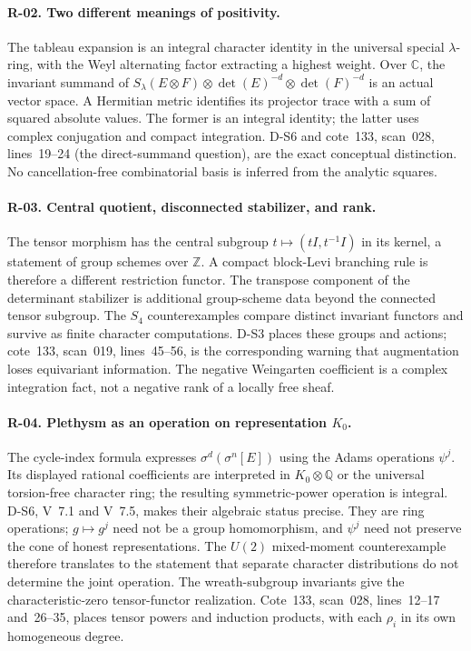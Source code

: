 \documentclass[11pt,a4paper]{article}
\theoremstyle{definition}\newtheorem{definition}{Definition}
\begin{document}
\paragraph{R-02. Two different meanings of positivity.}
The tableau expansion is an integral character identity in the universal special $\lambda$-ring, with the Weyl alternating factor extracting a highest weight. Over $\mathbb C$, the invariant summand of $S_\lambda(E\otimes F)\otimes\det(E)^{-d}\otimes\det(F)^{-d}$ is an actual vector space. A Hermitian metric identifies its projector trace with a sum of squared absolute values. The former is an integral identity; the latter uses complex conjugation and compact integration. D-S6 and cote~133, scan~028, lines~19--24 (the direct-summand question), are the exact conceptual distinction. No cancellation-free combinatorial basis is inferred from the analytic squares.

\paragraph{R-03. Central quotient, disconnected stabilizer, and rank.}
The tensor morphism has the central subgroup $t\mapsto(tI,t^{-1}I)$ in its kernel, a statement of group schemes over $\mathbb Z$. A compact block-Levi branching rule is therefore a different restriction functor. The transpose component of the determinant stabilizer is additional group-scheme data beyond the connected tensor subgroup. The $S_4$ counterexamples compare distinct invariant functors and survive as finite character computations. D-S3 places these groups and actions; cote~133, scan~019, lines~45--56, is the corresponding warning that augmentation loses equivariant information. The negative Weingarten coefficient is a complex integration fact, not a negative rank of a locally free sheaf.

\paragraph{R-04. Plethysm as an operation on representation $K_0$.}
The cycle-index formula expresses $\sigma^d(\sigma^n[E])$ using the Adams operations $\psi^j$. Its displayed rational coefficients are interpreted in $K_0\otimes\mathbb Q$ or the universal torsion-free character ring; the resulting symmetric-power operation is integral. D-S6, V~7.1 and V~7.5, makes their algebraic status precise. They are ring operations; $g\mapsto g^j$ need not be a group homomorphism, and $\psi^j$ need not preserve the cone of honest representations. The $U(2)$ mixed-moment counterexample therefore translates to the statement that separate character distributions do not determine the joint operation. The wreath-subgroup invariants give the characteristic-zero tensor-functor realization. Cote~133, scan~028, lines~12--17 and~26--35, places tensor powers and induction products, with each $\rho_i$ in its own homogeneous degree.
\end{document}
